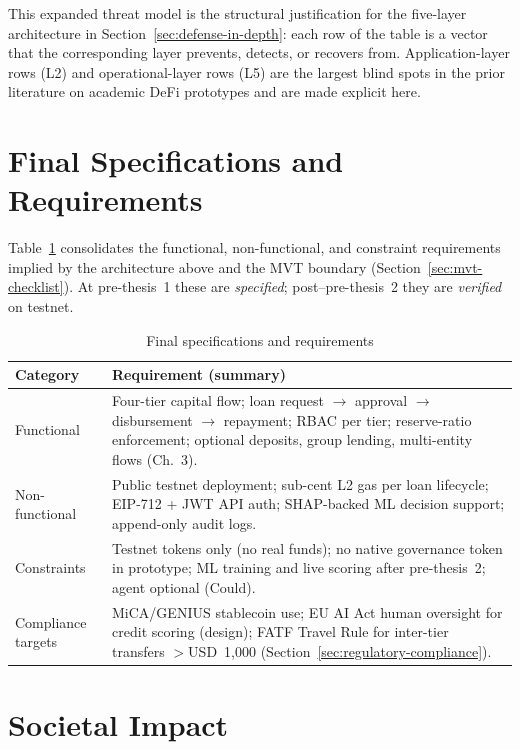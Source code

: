 \documentclass[12pt, a4paper]{report}
\newcommand{\tableheadcolor}{\rowcolor{TableHeadBg}}
\begin{document}
This expanded threat model is the structural justification for the five-layer architecture in Section~\ref{sec:defense-in-depth}: each row of the table is a vector that the corresponding layer prevents, detects, or recovers from. Application-layer rows (L2) and operational-layer rows (L5) are the largest blind spots in the prior literature on academic DeFi prototypes and are made explicit here.

\section{Final Specifications and Requirements}
\label{sec:final-specifications}

Table~\ref{tab:final-requirements} consolidates the functional, non-functional, and constraint requirements implied by the architecture above and the MVT boundary (Section~\ref{sec:mvt-checklist}). At pre-thesis~1 these are \textit{specified}; post--pre-thesis~2 they are \textit{verified} on testnet.

\begin{table}[H]
\centering
\caption[Final specifications and requirements]{Final specifications and requirements}
\label{tab:final-requirements}
\footnotesize
\begin{tabular}{p{2.4cm}p{11.6cm}}
\toprule
\tableheadcolor
\textbf{Category} & \textbf{Requirement (summary)} \\
\midrule
Functional & Four-tier capital flow; loan request $\to$ approval $\to$ disbursement $\to$ repayment; RBAC per tier; reserve-ratio enforcement; optional deposits, group lending, multi-entity flows (Ch.~3). \\
Non-functional & Public testnet deployment; sub-cent L2 gas per loan lifecycle; EIP-712 + JWT API auth; SHAP-backed ML decision support; append-only audit logs. \\
Constraints & Testnet tokens only (no real funds); no native governance token in prototype; ML training and live scoring after pre-thesis~2; agent optional (Could). \\
Compliance targets & MiCA/GENIUS stablecoin use; EU AI Act human oversight for credit scoring (design); FATF Travel Rule for inter-tier transfers $>$USD~1{,}000 (Section~\ref{sec:regulatory-compliance}). \\
\bottomrule
\end{tabular}
\end{table}

\section{Societal Impact}
\label{sec:societal-impact}
\end{document}
